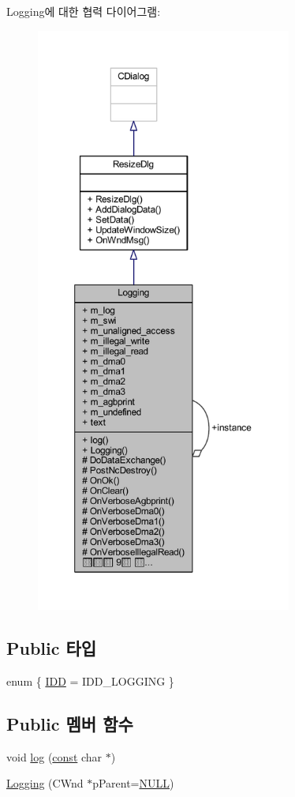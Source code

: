 Logging에 대한 협력 다이어그램\+:\nopagebreak
\begin{figure}[H]
\begin{center}
\leavevmode
\includegraphics[height=550pt]{class_logging__coll__graph}
\end{center}
\end{figure}
\subsection*{Public 타입}
\begin{DoxyCompactItemize}
\item 
enum \{ \mbox{\hyperlink{class_logging_a6590c79913651cd5b099a01eb6159affa8a7892ae8d4e892222e161f5ff522a9e}{I\+DD}} = I\+D\+D\+\_\+\+L\+O\+G\+G\+I\+NG
 \}
\end{DoxyCompactItemize}
\subsection*{Public 멤버 함수}
\begin{DoxyCompactItemize}
\item 
void \mbox{\hyperlink{class_logging_a01865a1ae55994b43fb518909bbe1552}{log}} (\mbox{\hyperlink{getopt1_8c_a2c212835823e3c54a8ab6d95c652660e}{const}} char $\ast$)
\item 
\mbox{\hyperlink{class_logging_a84ca355086d1c4e35b3db0b68126a0cd}{Logging}} (C\+Wnd $\ast$p\+Parent=\mbox{\hyperlink{_system_8h_a070d2ce7b6bb7e5c05602aa8c308d0c4}{N\+U\+LL}})
\end{DoxyCompactItemize}
